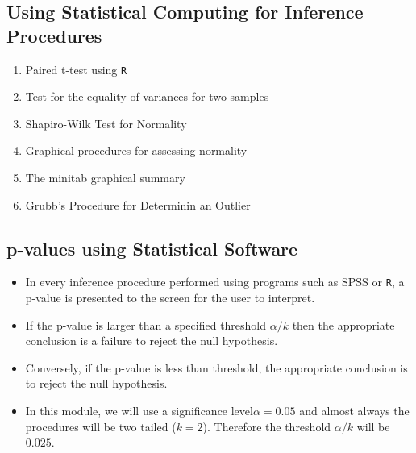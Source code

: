 \documentclass[]{report}
\begin{document}
\subsection{Using Statistical Computing for Inference Procedures}
\begin{enumerate}
	
	\item Paired t-test using \texttt{R}
	\item Test for the equality of variances for two samples
	\item Shapiro-Wilk Test for Normality
	\item Graphical procedures for assessing normality
	\item The minitab graphical summary
	\item Grubb's Procedure for Determinin an Outlier
\end{enumerate}


\subsection{p-values using Statistical Software}
\begin{itemize}
	\item In every inference procedure performed using programs such as SPSS or \texttt{R}, a p-value is presented to the screen for the user to interpret.
	
	\item If the p-value is larger than a specified threshold $\alpha/k$ then the appropriate conclusion is a
	failure to reject the null hypothesis.
	
	\item Conversely, if the p-value is less than threshold, the appropriate conclusion is to reject the null hypothesis.
	
	\item In this module, we will use a significance level$\alpha=0.05$ and almost always the procedures will be two tailed ($k=2$). Therefore the threshold $\alpha/k$ will be $0.025$.
\end{itemize}
\end{document}
